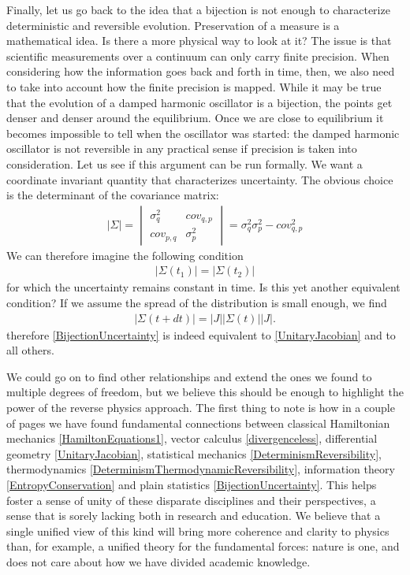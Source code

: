 \documentclass[10pt,twocolumn, nofootinbib]{revtex4-2}
\begin{document}
Finally, let us go back to the idea that a bijection is not enough to characterize deterministic and reversible evolution. Preservation of a measure is a mathematical idea. Is there a more physical way to look at it? The issue is that scientific measurements over a continuum can only carry finite precision. When considering how the information goes back and forth in time, then, we also need to take into account how the finite precision is mapped. While it may be true that the evolution of a damped harmonic oscillator is a bijection, the points get denser and denser around the equilibrium. Once we are close to equilibrium it becomes impossible to tell when the oscillator was started: the damped harmonic oscillator is not reversible in any practical sense if precision is taken into consideration. Let us see if this argument can be run formally. We want a coordinate invariant quantity that characterizes uncertainty. The obvious choice is the determinant of the covariance matrix:
\begin{align}\label{CovarianceMatrix}
	|\Sigma| = \begin{vmatrix}
		\sigma_q^2 & cov_{q,p} \\
		cov_{p,q} & \sigma_p^2
	\end{vmatrix} = \sigma_q^2 \sigma_p^2 - cov_{q,p}^2
\end{align}
We can therefore imagine the following condition
\begin{align}\label{BijectionUncertainty}
	|\Sigma(t_1)| = |\Sigma(t_2)| 
\end{align}
for which the uncertainty remains constant in time. Is this yet another equivalent condition? If we assume the spread of the distribution is small enough, we find
\begin{align}
	|\Sigma(t + dt)| = |J| |\Sigma(t)| |J|.
\end{align}
therefore \eqref{BijectionUncertainty} is indeed equivalent to \eqref{UnitaryJacobian} and to all others.

We could go on to find other relationships and extend the ones we found to multiple degrees of freedom, but we believe this should be enough to highlight the power of the reverse physics approach. The first thing to note is how in a couple of pages we have found fundamental connections between classical Hamiltonian mechanics \eqref{HamiltonEquations1}, vector calculus \eqref{divergenceless}, differential geometry \eqref{UnitaryJacobian}, statistical mechanics \eqref{DeterminismReversibility}, thermodynamics \eqref{DeterminismThermodynamicReversibility}, information theory \eqref{EntropyConservation} and plain statistics \eqref{BijectionUncertainty}. This helps foster a sense of unity of these disparate disciplines and their perspectives, a sense that is sorely lacking both in research and education. We believe that a single unified view of this kind will bring more coherence and clarity to physics than, for example, a unified theory for the fundamental forces: nature is one, and does not care about how we have divided academic knowledge.
\end{document}

